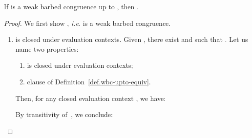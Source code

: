 \documentclass{LMCS}
\makeatletter
\newcommand{\ie}{\emph{i.e.}\@\xspace}
\renewcommand{\_}{\mathord{\rule[-.25ex]{1ex}{.15ex}}}
\makeatother
\begin{document}
\begin{lem}\label{lemma.wbc-upto-equiv}
  If  is a weak barbed congruence up to , then
  .
\end{lem}
\begin{proof}
  We first show   , \ie  is
  a weak barbed congruence.
  \begin{enumerate}[(1)]
  \item  is closed under evaluation contexts. Given
    , there exist  and  such that
    .
    Let us name two properties:
    \begin{enumerate}
    \item  is closed under evaluation contexts;
    \item clause  of Definition~\ref{def.wbc-upto-equiv}.
    \end{enumerate}
    Then, for any closed evaluation context , we have:
    
    By transitivity of~, we conclude:
    

\end{enumerate}
\end{proof}
\end{document}
